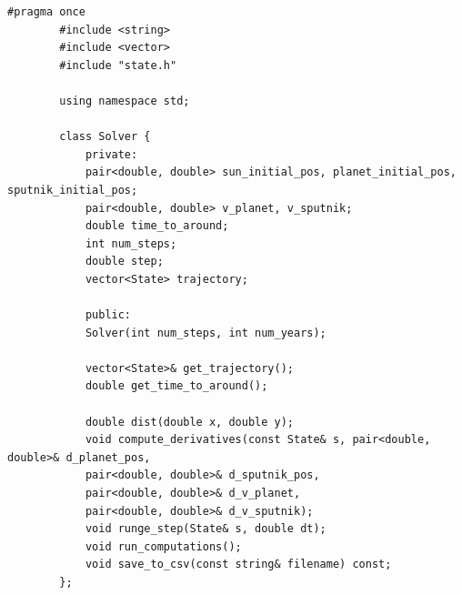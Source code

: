 \documentclass[14pt,a4paper]{extarticle}
\theoremstyle{plain}
\begin{document}
	\begin{lstlisting}[title=solver.h, gobble=16, breaklines=true, breakatwhitespace=true]
		#pragma once 
		#include <string>
		#include <vector>
		#include "state.h"
		
		using namespace std;
		
		class Solver {
			private:
			pair<double, double> sun_initial_pos, planet_initial_pos, sputnik_initial_pos;
			pair<double, double> v_planet, v_sputnik;
			double time_to_around;
			int num_steps;
			double step;
			vector<State> trajectory;
			
			public:
			Solver(int num_steps, int num_years);
			
			vector<State>& get_trajectory();
			double get_time_to_around();
			
			double dist(double x, double y);
			void compute_derivatives(const State& s, pair<double, double>& d_planet_pos,
			pair<double, double>& d_sputnik_pos, 
			pair<double, double>& d_v_planet,
			pair<double, double>& d_v_sputnik);
			void runge_step(State& s, double dt);
			void run_computations();
			void save_to_csv(const string& filename) const;
		};
	\end{lstlisting}
	
\end{document}
